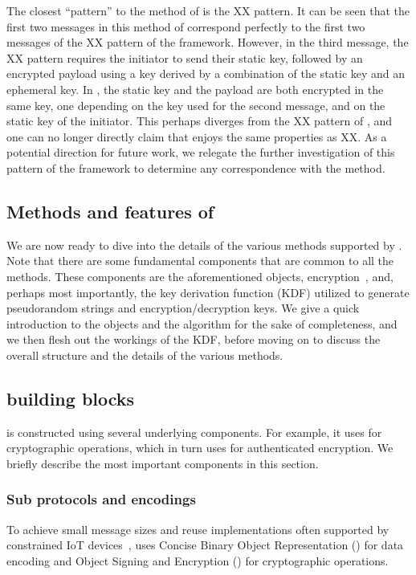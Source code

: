 {The closest \mNoise{} ``pattern'' to the \mStatStat{} method of \mEdhoc{} is the
XX pattern. It can be seen that the first two messages in this method of
\mEdhoc{} correspond perfectly to the first two messages of the XX pattern of
the \mNoise{} framework. However, in the third message, the XX pattern requires
the initiator to send their static key, followed by an encrypted payload using a
key derived by a combination of the static key and an ephemeral key. In
\mEdhoc{}, the static key and the payload are both encrypted in the same key, one depending on the key used for the second message, and on the static key of the initiator.
This perhaps diverges from the XX pattern of \mNoise{}, and one can no longer
directly claim that \mEdhoc{} enjoys the same properties as XX. As a potential
direction for future work, we relegate the further investigation of this pattern
of the \mNoise{} framework to {determine any} correspondence with the
\mStatStat{} method.

\subsection{Methods and features of \mEdhoc}\label{sec:methods}
We are now ready to dive into the details of the various methods supported by
\mEdhoc. Note that there are some fundamental components that are common to all
the \mEdhoc methods. These components are the aforementioned \mCose{} objects,
\mAead{} encryption~\cite{aead}, and, perhaps most importantly, the key
derivation function (KDF) utilized to generate pseudorandom strings and
encryption/decryption keys. We give a quick introduction to the \mCose{} objects and the \mAead{} algorithm for the sake of completeness, and we then flesh out the workings of the KDF, before moving on to discuss the {overall structure and the details of the various} methods.

\subsection{\mEdhoc{} building blocks}
\mEdhoc{} is constructed using several underlying components.
For example, it uses \mCose{} for cryptographic operations, which in turn
uses \mAead{} for authenticated encryption. We briefly describe the most
important components in this section.

\subsubsection{Sub protocols and encodings}
To achieve small message sizes and reuse implementations often supported by constrained IoT devices~\cite{Lorawan1,Lorawan2}, \mEdhoc{} uses Concise Binary Object Representation (\mCbor) for data encoding and \mCbor{} Object Signing and Encryption (\mCose) for cryptographic operations.

}
